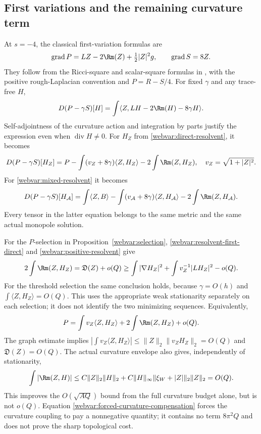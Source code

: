 \subsection{First variations and the remaining curvature term}

At $s=-4$, the classical first-variation formulas are
\begin{equation}\label{webvar:curvature-gradients}
 \operatorname{grad}P=LZ-2\Rm(Z)+\tfrac12|Z|^2g,\qquad
 \operatorname{grad}S=8Z.
\end{equation}
They follow from the Ricci-square and scalar-square formulas in
\cite[Section~2.1, equations (2.5) and (2.9)]{GurskyViaclovsky},
with the positive rough-Laplacian convention and $P=R-S/4$.
For fixed $\gamma$ and any trace-free $H$,
\begin{equation}\label{webvar:resolvent-first-general}
 D(P-\gamma S)[H]
 =\int\langle Z,LH-2\Rm(H)-8\gamma H\rangle.
\end{equation}
Self-adjointness of the curvature action and integration by parts
justify the expression even when $\operatorname{div}H\ne0$.
For $H_Z$ from \eqref{webvar:direct-resolvent}, it becomes
\begin{equation}\label{webvar:resolvent-first-direct}
 D(P-\gamma S)[H_Z]
 =P-\int(v_Z+8\gamma)\langle Z,H_Z\rangle
                  -2\int\Rm(Z,H_Z),\quad v_Z=\sqrt{1+|Z|^2}.
\end{equation}
For \eqref{webvar:mixed-resolvent} it becomes
\begin{equation}\label{webvar:resolvent-first-mixed}
 D(P-\gamma S)[H_{\mathcal A}]
 =\int\langle Z,B\rangle-\int(v_{\mathcal A}+8\gamma)
       \langle Z,H_{\mathcal A}\rangle-2\int\Rm(Z,H_{\mathcal A}).
\end{equation}
Every tensor in the latter equation belongs to the same metric and
the same actual monopole solution.

For the $P$-selection in Proposition~\ref{webvar:selection},
\eqref{webvar:resolvent-first-direct} and
\eqref{webvar:positive-resolvent} give
\begin{equation}\label{webvar:forced-curvature-compensation}
 2\int\Rm(Z,H_Z)
 =\mathfrak D(Z)+o(Q)
 \ge\int|\nabla H_Z|^2+\int v_Z^{-1}|LH_Z|^2-o(Q).
\end{equation}
For the threshold selection the same conclusion holds, because
$\gamma=O(h)$ and $\int\langle Z,H_Z\rangle=O(Q)$.
This uses the appropriate weak stationarity separately on each
selection; it does not identify the two minimizing sequences.
Equivalently,
\[
 P=\int v_Z\langle Z,H_Z\rangle+2\int\Rm(Z,H_Z)+o(Q).
\]
The graph estimate implies
$|\int v_Z\langle Z,H_Z\rangle|
\le\|Z\|_2\|v_ZH_Z\|_2=O(Q)$ and $\mathfrak D(Z)=O(Q)$.
The actual curvature envelope also gives, independently of stationarity,
\begin{equation}\label{webvar:curvature-coupling-size}
 \int|\Rm(Z,H)|
 \le C\|Z\|_2\|H\|_2+
       C\|H\|_\infty\|\xi_W+|Z|\|_2\|Z\|_2=O(Q).
\end{equation}
This improves the $O(\sqrt{AQ})$ bound from the full curvature
budget alone, but is not $o(Q)$.  Equation
\eqref{webvar:forced-curvature-compensation} forces the curvature
coupling to pay a nonnegative quantity; it contains no term
$8\pi^2Q$ and does not prove the sharp topological cost.

